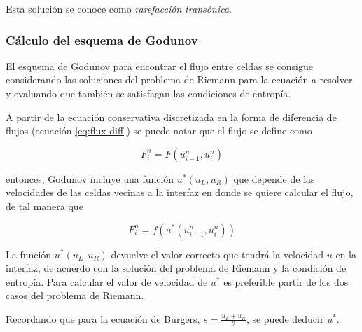 \documentclass[12pt]{article}
\begin{document}
 	Esta solución se conoce como \textit{rarefacción transónica}.
 	
 	\subsubsection{Cálculo del esquema de Godunov}
 	El esquema de Godunov para encontrar el flujo entre celdas se consigue considerando las soluciones del problema de Riemann para la ecuación a resolver y evaluando que también se satisfagan las condiciones de entropía. 
 	
 	A partir de la ecuación conservativa discretizada en la forma de diferencia de flujos (ecuación \ref{eq:flux-diff}) se puede notar que el flujo se define como
 	
 	\begin{equation}
		F_{i}^{n} = F(u_{i-1}^{n}, u_{i}^{n})
 	\end{equation}
 

 	entonces, Godunov incluye una función $u^{*}(u_L, u_R)$ que depende de las velocidades de las celdas vecinas a la interfaz en donde se quiere calcular el flujo, de tal manera que
 	
 	\begin{equation}
 		F_{i}^{n} = f(u^{*}(u_{i-1}^{n}, u_{i}^{n}))
 	\end{equation}
 	
 	
 	La función $u^{*}(u_L, u_R)$ devuelve el valor correcto que tendrá la velocidad $u$ en la interfaz, de acuerdo con la solución del problema de Riemann y la condición de entropía. Para calcular el valor de velocidad de $u^{*}$ es preferible partir de los dos casos del problema de Riemann.
 	
	Recordando que para la ecuación de Burgers, $s = \frac{u_L + u_R}{2}$, se puede deducir $u^{*}$. 
 	
\end{document}

